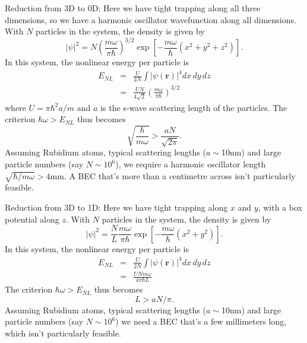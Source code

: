 \documentclass{iopart}
\begin{document}
Reduction from 3D to 0D: Here we have tight trapping along all three dimensions, so we have a harmonic oscillator wavefunction along all dimensions. With $N$ particles in the system, the density is given by
\begin{equation}
|\psi|^2 = N \left( \frac{m \omega}{\pi \hbar} \right)^{3/2} \exp \left[ -\frac{m \omega} {\hbar} (x^2 +y^2+z^2) \right] .
\end{equation}
In this system, the nonlinear energy per particle is
\begin{eqnarray}
E_{NL} &=& \frac{U}{2N} \int |\psi({\mathbf{r}})|^4 dx \, dy \, dz \\
       &=& \frac{U N}{4 \sqrt{2}} \left( \frac{m \omega}{\pi \hbar} \right)^{3/2}
\end{eqnarray}
where $U = \pi \hbar^2 a/m$ and $a$ is the s-wave scattering length of the particles. The criterion $\hbar \omega > E_{NL}$ thus becomes
\begin{equation}
\sqrt{\frac{\hbar}{m \omega}} > \frac{aN}{\sqrt{2 \pi}}.
\end{equation}
Assuming Rubidium atoms, typical scattering lengths ($a\sim$10nm) and large particle numbers (say $N\sim 10^6$), we require a harmonic oscillator length $\sqrt{\hbar/ m \omega}>4$mm.  A BEC that's more than a centimetre across isn't particularly feasible.

Reduction from 3D to 1D: Here we have tight trapping along $x$ and $y$, with a box potential along $z$. With $N$ particles in the system, the density is given by
\begin{equation}
|\psi|^2 = \frac{N}{L} \frac{m \omega}{\pi \hbar} \exp \left[ -\frac{m \omega} {\hbar}  (x^2 +y^2) \right] .
\end{equation}
In this system, the nonlinear energy per particle is
\begin{eqnarray}
E_{NL} &=& \frac{U}{2N} \int |\psi({\mathbf{r}})|^4 dx \, dy \, dz \\
       &=& \frac{U N m \omega}{4 \pi \hbar L}
\end{eqnarray}
The criterion $\hbar \omega > E_{NL}$ thus becomes
\begin{equation}
L > a N / \pi.
\end{equation}
Assuming Rubidium atoms, typical scattering lengths ($a\sim$10nm) and large particle numbers (say $N\sim 10^6$) we need a BEC that's a few millimeters long, which isn't particularly feasible.
\end{document}
